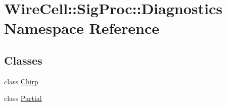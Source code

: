 \hypertarget{namespace_wire_cell_1_1_sig_proc_1_1_diagnostics}{}\section{Wire\+Cell\+:\+:Sig\+Proc\+:\+:Diagnostics Namespace Reference}
\label{namespace_wire_cell_1_1_sig_proc_1_1_diagnostics}
\subsection*{Classes}
\begin{DoxyCompactItemize}
\item 
class \hyperlink{class_wire_cell_1_1_sig_proc_1_1_diagnostics_1_1_chirp}{Chirp}
\item 
class \hyperlink{class_wire_cell_1_1_sig_proc_1_1_diagnostics_1_1_partial}{Partial}
\end{DoxyCompactItemize}
